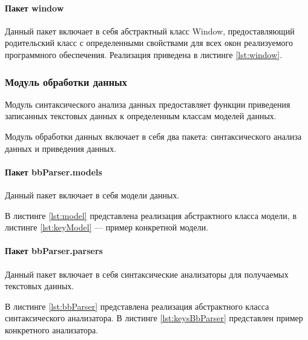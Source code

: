 \paragraph{Пакет window \newline}
Данный пакет включает в себя абстрактный класс Window, предоставляющий родительский класс с определенными свойствами для всех окон реализуемого программного обеспечения. Реализация приведена в листинге \ref{lst:window}.
\subsubsection{Модуль обработки данных}
Модуль синтаксического анализа данных предоставляет функции приведения записанных текстовых данных к определенным классам моделей данных.

Модуль обработки данных включает в себя два пакета: синтаксического анализа данных и приведения данных.

\paragraph{Пакет bbParser.models \newline}
Данный пакет включает в себя модели данных.

В листинге \ref{lst:model} представлена реализация абстрактного класса модели, в листинге \ref{lst:keyModel} --- пример конкретной модели.





\paragraph{Пакет bbParser.parsers \newline}
Данный пакет включает в себя синтаксические анализаторы для получаемых текстовых данных.

В листинге \ref{lst:bbParser} представлена реализация абстрактного класса синтаксического анализатора. В листинге \ref{lst:keysBbParser} представлен пример конкретного анализатора.



